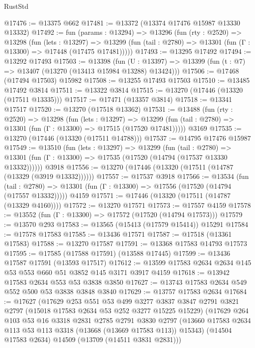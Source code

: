 \begin{lexlean}{RustStd}
\begin{coremodule}
@17476 := @13375 @662
@17481 := @13372 (@13374 @17476 @15987 @13330 @13332)
@17492 := fun (params : @13294) =>
  @13296
    (fun (rty : @2520) =>
    @13298
      (fun (lets : @13297) =>
      @13299 (fun (tail : @2780) => @13301 (fun (Γ : @13300) => @17448 (@17475 @17481)))))
@17493 := @13295 @17492
@17494 := @13292 @17493
@17503 := @13398
    (fun (U : @13397) => @13399 (fun (t : @7) => @13407 (@13270 (@13413 @15984 @13288) @13424)))
@17506 := @17468 (@17494 @17503) @15982
@17508 := @13255 @17493 @17503
@17510 := @13485 @17492 @3814
@17511 := @13322 @3814
@17515 := @13270 (@17446 (@13320 (@17511 @13335)))
@17517 := @17471 (@13357 @3814)
@17518 := @13341 @17517
@17520 := @13270 (@17518 @13362)
@17531 := @13488
    (fun (rty : @2520) =>
    @13298
      (fun (lets : @13297) =>
      @13299 (fun (tail : @2780) => @13301 (fun (Γ : @13300) => @17515 (@17520 @17481)))))
    @3169
@17535 := @13270 (@17446 (@13320 (@17511 @14788)))
@17537 := @14795 @17476 @15987
@17549 := @13510
    (fun (lets : @13297) =>
    @13299
      (fun (tail : @2780) =>
      @13301 (fun (Γ : @13300) => @17535 (@17520 (@14794 (@17537 @13330 @13332))))))
    @3918
@17556 := @13270 (@17446 (@13320 (@17511 (@14787 (@13329 (@3919 @13332))))))
@17557 := @17537 @3918
@17566 := @13534
    (fun (tail : @2780) => @13301 (fun (Γ : @13300) => @17556 (@17520 (@14794 (@17557 @13332)))))
    @4159
@17571 := @17446 (@13320 (@17511 (@14787 (@13329 @4160))))
@17572 := @13270 @17571
@17573 := @17557 @4159
@17578 := @13552 (fun (Γ : @13300) => @17572 (@17520 (@14794 @17573)))
@17579 := @13570 @293
@17583 := @13565 (@15413 (@17579 @15414)) @15291
@17584 := @17578 @17583
@17585 := @13436 @17571
@17587 := @17518 (@13361 @17583)
@17588 := @13270 @17587
@17591 := @13368 @17583 @14793 @17573
@17595 := @17585 (@17588 @17591) (@13588 @17445)
@17599 := @13436 @17587 @17591 (@13593 @17517)
@17612 := @13599 @17583 @2634 @2634 @145 @53 @553 @660 @51 @3852 @145 @3171 @3917 @4159
@17618 := @13942 @17583 @2634 @553 @53 @3838 @3850
@17627 := @13743 @17583 @2634 @549 @552 @500 @53 @3838 @3848 @3840
@17629 := @13757 @17583 @2634
@17684 := @17627
    (@17629
      @253
      @551
      @53
      @499
      @3277
      @3837
      @3847
      @2791
      @3821
      @2797
      (@15018 @17583 @2634 @53 @252 @3277 @15225 @15229)
      (@17629
        @264
        @103
        @53
        @16
        @3318
        @2831
        @2785
        @2791
        @3830
        @2797
        (@13660 @17583 @2634 @113 @53 @113 @3318 (@13668 (@13669 @17583 @113)) @15343)
        (@14504 @17583 @2634)
        @14509
        (@13709 (@14511 @3831 @2831)))

\end{coremodule}
\end{lexlean}
